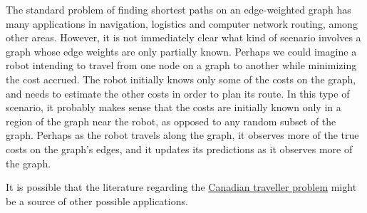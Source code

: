 
The standard problem of finding shortest paths on an edge-weighted graph has many applications in navigation, logistics and computer network routing, among other areas. However, it is not immediately clear what kind of scenario involves a graph whose edge weights are only partially known. Perhaps we could imagine a robot intending to travel from one node on a graph to another while minimizing the cost accrued. The robot initially knows only some of the costs on the graph, and needs to estimate the other costs in order to plan its route. In this type of scenario, it probably makes sense that the costs are initially known only in a region of the graph near the robot, as opposed to any random subset of the graph. Perhaps as the robot travels along the graph, it observes more of the true costs on the graph's edges, and it updates its predictions as it observes more of the graph.

It is possible that the literature regarding the \href{https://en.wikipedia.org/wiki/Canadian_traveller_problem#:~:text=In%20computer%20science%20and%20graph,a%20certain%20%22realization%20restriction.%22}{Canadian traveller problem} might be a source of other possible applications.